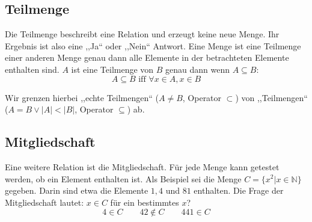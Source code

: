 \subsection{Teilmenge}
%
Die Teilmenge beschreibt eine Relation und erzeugt keine neue Menge.
Ihr Ergebnis ist also eine ,,Ja`` oder ,,Nein`` Antwort.
Eine Menge ist eine Teilmenge einer anderen Menge genau dann alle
Elemente in der betrachteten Elemente enthalten sind. $A$ ist eine
Teilmenge von $B$ genau dann wenn $A \subseteq B$:
\[
    A \subseteq B \text{ iff } \forall x \in A, x \in B
\]

Wir grenzen hierbei ,,echte Teilmengen`` ($A \neq B$, Operator $\subset$)
von ,,Teilmengen`` ($A = B \lor |A| < |B|$, Operator $\subseteq$) ab.

\subsection{Mitgliedschaft}
%
Eine weitere Relation ist die Mitgliedschaft.
Für jede Menge kann getestet werden, ob ein Element enthalten ist. Als Beispiel
sei die Menge $C = \{x^2 | x \in \mathbb{N}\}$ gegeben. Darin sind etwa die Elemente
$1, 4$ und $81$ enthalten. Die Frage der Mitgliedschaft lautet: $x \in C$ für
ein bestimmtes $x$?
\[
  4 \in C  \qquad  42 \notin C  \qquad  441 \in C
\]


